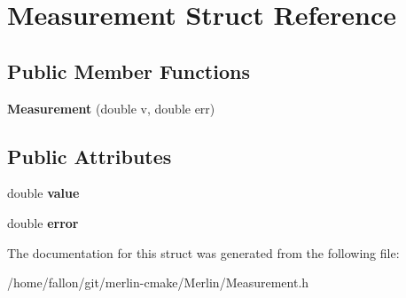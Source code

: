 \hypertarget{structMeasurement}{}\section{Measurement Struct Reference}
\label{structMeasurement}
\subsection*{Public Member Functions}
\begin{DoxyCompactItemize}
\item 
\mbox{\label{structMeasurement_a44c789182a2f0f835cf21b019d9f7ee7}} 
{\bfseries Measurement} (double v, double err)
\end{DoxyCompactItemize}
\subsection*{Public Attributes}
\begin{DoxyCompactItemize}
\item 
\mbox{\label{structMeasurement_a823f1a4e614b8d87fa80b58b88207504}} 
double {\bfseries value}
\item 
\mbox{\label{structMeasurement_af356f5e1725db528491f041cc521aa7c}} 
double {\bfseries error}
\end{DoxyCompactItemize}


The documentation for this struct was generated from the following file\+:\begin{DoxyCompactItemize}
\item 
/home/fallon/git/merlin-\/cmake/\+Merlin/Measurement.\+h\end{DoxyCompactItemize}
